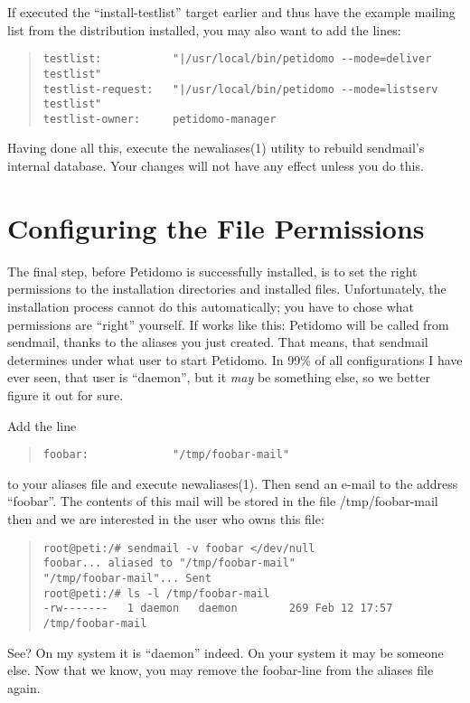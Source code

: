 \documentclass[a4paper,11pt]{scrreprt}
\newcommand{\file}[1]{{\sf #1}}
\begin{document}
If executed the ``install-testlist'' target earlier and thus have the
example mailing list from the distribution installed, you may also
want to add the lines:
\begin{quote}
\begin{verbatim}
testlist:           "|/usr/local/bin/petidomo --mode=deliver testlist"
testlist-request:   "|/usr/local/bin/petidomo --mode=listserv testlist"
testlist-owner:     petidomo-manager
\end{verbatim}
\end{quote}
Having done all this, execute the newaliases(1) utility to rebuild
sendmail's internal database. Your changes will not have any effect
unless you do this.

\section{Configuring the File Permissions}

The final step, before Petidomo is successfully installed, is to set
the right permissions to the installation directories and installed
files. Unfortunately, the installation process cannot do this
automatically; you have to chose what permissions are ``right''
yourself. If works like this: Petidomo will be called from sendmail,
thanks to the aliases you just created. That means, that sendmail
determines under what user to start Petidomo. In 99\% of all
configurations I have ever seen, that user is ``daemon'', but it
\emph{may} be something else, so we better figure it out for sure.

Add the line
\begin{quote}
\begin{verbatim}
foobar:             "/tmp/foobar-mail"
\end{verbatim}
\end{quote}
to your aliases file and execute newaliases(1). Then send an e-mail to
the address ``foobar''. The contents of this mail will be stored in
the file \file{/tmp/foobar-mail} then and we are interested in the user
who owns this file:
\begin{quote}
\begin{verbatim}
root@peti:/# sendmail -v foobar </dev/null
foobar... aliased to "/tmp/foobar-mail"
"/tmp/foobar-mail"... Sent
root@peti:/# ls -l /tmp/foobar-mail
-rw-------   1 daemon   daemon        269 Feb 12 17:57 /tmp/foobar-mail
\end{verbatim}
\end{quote}
See? On my system it is ``daemon'' indeed. On your system it may be
someone else. Now that we know, you may remove the foobar-line from
the aliases file again.
\end{document}
